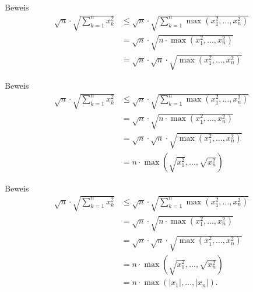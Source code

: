 \documentclass[10pt]{beamer}
\begin{document}
\begin{frame}{Beweis}
    \begin{align*}
        \sqrt{n} \cdot \sqrt{\sum_{k = 1}^{n} x_{k}^{2}} 
        & \leq \sqrt{n} \cdot \sqrt{\sum_{k = 1}^{n} \max\left( x_{1}^{2}, \ldots, x_{n}^{2} \right)} \\
        & = \sqrt{n} \cdot \sqrt{n \cdot \max\left( x_{1}^{2}, \ldots, x_{n}^{2} \right)} \\
        & = \sqrt{n} \cdot \sqrt{n} \cdot \sqrt{\max\left( x_{1}^{2}, \ldots, x_{n}^{2} \right)}
    \end{align*}
\end{frame}



\begin{frame}{Beweis}
    \begin{align*}
        \sqrt{n} \cdot \sqrt{\sum_{k = 1}^{n} x_{k}^{2}} 
        & \leq \sqrt{n} \cdot \sqrt{\sum_{k = 1}^{n} \max\left( x_{1}^{2}, \ldots, x_{n}^{2} \right)} \\
        & = \sqrt{n} \cdot \sqrt{n \cdot \max\left( x_{1}^{2}, \ldots, x_{n}^{2} \right)} \\
        & = \sqrt{n} \cdot \sqrt{n} \cdot \sqrt{\max\left( x_{1}^{2}, \ldots, x_{n}^{2} \right)} \\
        & = n \cdot \max\left( \sqrt{x_{1}^{2}}, \ldots, \sqrt{x_{n}^{2}} \right) 
    \end{align*}
\end{frame}



\begin{frame}{Beweis}
    \begin{align*}
        \sqrt{n} \cdot \sqrt{\sum_{k = 1}^{n} x_{k}^{2}} 
        & \leq \sqrt{n} \cdot \sqrt{\sum_{k = 1}^{n} \max\left( x_{1}^{2}, \ldots, x_{n}^{2} \right)} \\
        & = \sqrt{n} \cdot \sqrt{n \cdot \max\left( x_{1}^{2}, \ldots, x_{n}^{2} \right)} \\
        & = \sqrt{n} \cdot \sqrt{n} \cdot \sqrt{\max\left( x_{1}^{2}, \ldots, x_{n}^{2} \right)} \\
        & = n \cdot \max\left( \sqrt{x_{1}^{2}}, \ldots, \sqrt{x_{n}^{2}} \right) \\
        & = n \cdot \max( \left\vert x_{1} \right\vert, \ldots, \left\vert x_{n} \right\vert).
    \end{align*}
\end{frame}
\end{document}

